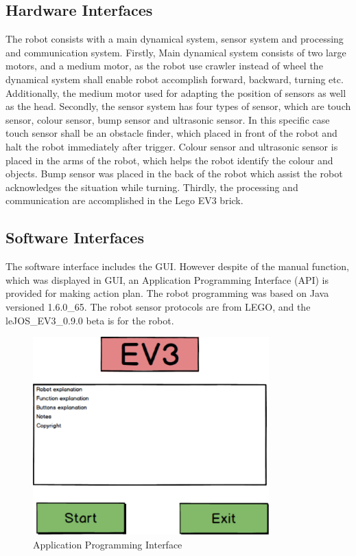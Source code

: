 \documentclass[11pt, a4paper]{article}
\begin{document}
\subsection{Hardware Interfaces}
The robot consists with a main dynamical system, sensor system and processing and communication system. Firstly, Main dynamical system consists of two large motors, and a medium motor, as the robot use crawler instead of wheel the dynamical system shall enable robot accomplish forward, backward, turning etc. Additionally, the medium motor used for adapting the position of sensors as well as the head. Secondly, the sensor system has four types of sensor, which are touch sensor, colour sensor, bump sensor and ultrasonic sensor. In this specific case touch sensor shall be an obstacle finder, which placed in front of the robot and halt the robot immediately after trigger. Colour sensor and ultrasonic sensor is placed in the arms of the robot, which helps the robot identify the colour and objects. Bump sensor was placed in the back of the robot which assist the robot acknowledges the situation while turning. Thirdly, the processing and communication are accomplished in the Lego EV3 brick.

\subsection{Software Interfaces}
The software interface includes the GUI.  However despite of the manual function, which was displayed in GUI, an Application Programming Interface (API) is provided for making action plan. The robot programming was based on Java versioned 1.6.0\_65. The robot sensor protocols are from LEGO, and the leJOS\_EV3\_0.9.0 beta is for the robot.
\begin{figure}[H]
\centering
\includegraphics[height=3in]{PI}
\caption[Application Programming Interface]{Application Programming Interface}
\end{figure}
\end{document}
